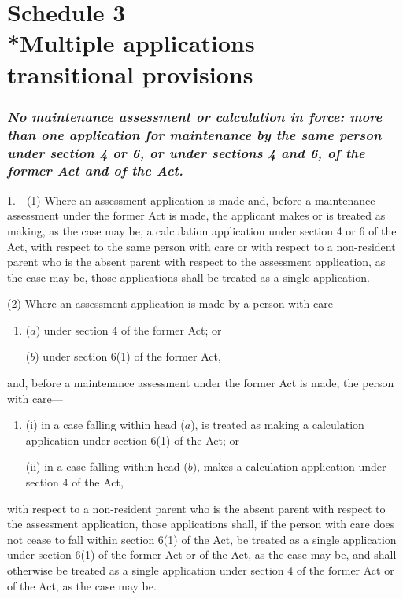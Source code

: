 \documentclass[12pt,a4paper]{article}
\begin{document}
\part[Schedule 3 --- Multiple applications---transitional provisions]{Schedule 3\\*Multiple applications---transitional provisions}

\renewcommand\parthead{--- Schedule 3}


\section*{\itshape No maintenance assessment or calculation in force: more than one application for maintenance by the same person under section 4 or 6, or under sections 4 and 6, of the former Act and of the Act.}

1.---(1)  Where an assessment application is made and, before a maintenance assessment under the former Act is made, the applicant makes or is treated as making, as the case may be, a calculation application under section 4 or 6 of the Act, with respect to the same person with care or with respect to a non-resident parent who is the absent parent with respect to the assessment application, as the case may be, those applications shall be treated as a single application.

(2) Where an assessment application is made by a person with care—
\begin{enumerate}\item[]
($a$) under section 4 of the former Act; or

($b$) under section 6(1) of the former Act,
\end{enumerate}
and, before a maintenance assessment under the former Act is made, the person with care—
\begin{enumerate}\item[]
(i) in a case falling within head ($a$), is treated as making a calculation application under section 6(1) of the Act; or

(ii) in a case falling within head ($b$), makes a calculation application under section 4 of the Act,
\end{enumerate}
with respect to a non-resident parent who is the absent parent with respect to the assessment application, those applications shall, if the person with care does not cease to fall within section 6(1) of the Act, be treated as a single application under section 6(1) of the former Act or of the Act, as the case may be, and shall otherwise be treated as a single application under section 4 of the former Act or of the Act, as the case may be.
\end{document}

